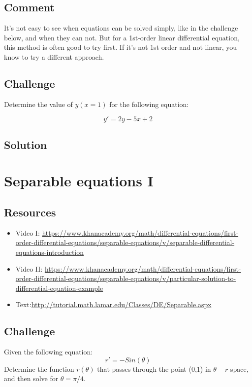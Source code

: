 \subsection*{Comment}
It's not easy to see when equations can be solved simply, like in the challenge below, and when they can not. But for a 1st-order linear differential equation, this method is often good to try first. If it's not 1st order and not linear, you know to try a different approach.

\subsection*{Challenge}
Determine the value of $y(x=1)$ for the following equation:

\begin{equation}
    y'=2y-5x+2
\end{equation}

\subsection*{Solution}
\six{}


\timebox



\newpage
\section{Separable equations I}

\subsection*{Resources}
\begin{itemize}
    \item Video I: \url{https://www.khanacademy.org/math/differential-equations/first-order-differential-equations/separable-equations/v/separable-differential-equations-introduction} 
    \item Video II: \url{https://www.khanacademy.org/math/differential-equations/first-order-differential-equations/separable-equations/v/particular-solution-to-differential-equation-example}
    \item Text:\url{http://tutorial.math.lamar.edu/Classes/DE/Separable.aspx}
\end{itemize}

\subsection*{Challenge}
Given the following equation:
\begin{equation}
    r' = -Sin(\theta)
\end{equation}
Determine the function $r(\theta)$ that passes through the point (0,1) in $\theta-r$ space, and then solve for $\theta = \pi/4$.


